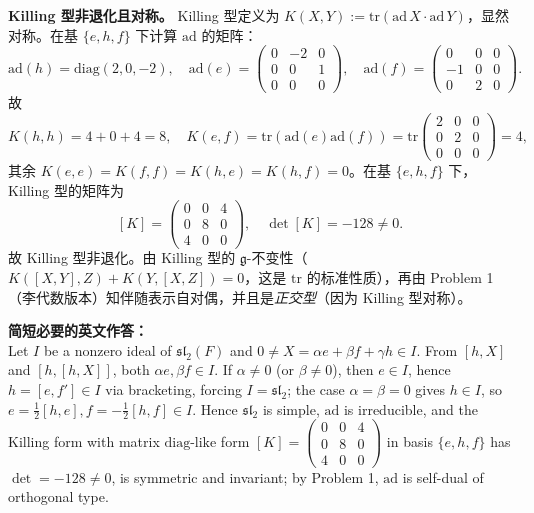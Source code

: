 \documentclass{ctexart}
\begin{document}
\textbf{Killing 型非退化且对称。} Killing 型定义为 $K(X, Y) := \mathrm{tr}(\mathrm{ad}\,X \cdot \mathrm{ad}\,Y)$，显然对称。在基 $\{e, h, f\}$ 下计算 $\mathrm{ad}$ 的矩阵：
\[
\mathrm{ad}(h) = \mathrm{diag}(2, 0, -2), \quad
\mathrm{ad}(e) = \begin{pmatrix} 0 & -2 & 0 \\ 0 & 0 & 1 \\ 0 & 0 & 0 \end{pmatrix}, \quad
\mathrm{ad}(f) = \begin{pmatrix} 0 & 0 & 0 \\ -1 & 0 & 0 \\ 0 & 2 & 0 \end{pmatrix}.
\]
故
\[
K(h, h) = 4 + 0 + 4 = 8, \quad K(e, f) = \mathrm{tr}(\mathrm{ad}(e)\mathrm{ad}(f)) = \mathrm{tr}\begin{pmatrix} 2 & 0 & 0 \\ 0 & 2 & 0 \\ 0 & 0 & 0 \end{pmatrix} = 4,
\]
其余 $K(e,e) = K(f,f) = K(h,e) = K(h,f) = 0$。在基 $\{e, h, f\}$ 下，Killing 型的矩阵为
\[
[K] = \begin{pmatrix} 0 & 0 & 4 \\ 0 & 8 & 0 \\ 4 & 0 & 0 \end{pmatrix}, \quad \det[K] = -128 \neq 0.
\]
故 Killing 型非退化。由 Killing 型的 $\mathfrak{g}$-不变性（$K([X,Y],Z) + K(Y,[X,Z]) = 0$，这是 $\mathrm{tr}$ 的标准性质），再由 Problem 1（李代数版本）知伴随表示自对偶，并且是\emph{正交型}（因为 Killing 型对称）。

\vspace{1em}
\textbf{简短必要的英文作答：}\\
Let $I$ be a nonzero ideal of $\mathfrak{sl}_2(F)$ and $0 \neq X=\alpha e+\beta f+\gamma h\in I$. From $[h,X]$ and $[h,[h,X]]$, both $\alpha e,\beta f\in I$. If $\alpha\neq 0$ (or $\beta\neq 0$), then $e\in I$, hence $h=[e,f']\in I$ via bracketing, forcing $I=\mathfrak{sl}_2$; the case $\alpha=\beta=0$ gives $h\in I$, so $e=\tfrac12[h,e],f=-\tfrac12[h,f]\in I$. Hence $\mathfrak{sl}_2$ is simple, $\mathrm{ad}$ is irreducible, and the Killing form with matrix $\mathrm{diag\text{-like}}$ form $[K]=\begin{pmatrix}0&0&4\\0&8&0\\4&0&0\end{pmatrix}$ in basis $\{e,h,f\}$ has $\det = -128 \neq 0$, is symmetric and invariant; by Problem 1, $\mathrm{ad}$ is self-dual of orthogonal type.
\end{document}
